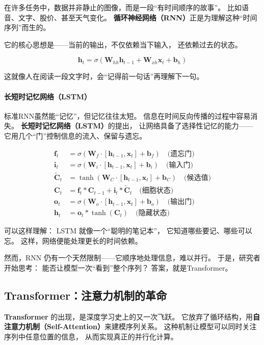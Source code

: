 在许多任务中，数据并非静止的图像，而是一段“有时间顺序的故事”。  
比如语音、文字、股价、甚至天气变化。  
\textbf{循环神经网络（RNN）}正是为理解这种“时间序列”而生的。  

它的核心思想是——当前的输出，不仅依赖当下输入，  
还依赖过去的状态。  

$$\mathbf{h}_t = \sigma(\mathbf{W}_{hh} \mathbf{h}_{t-1} + \mathbf{W}_{xh} \mathbf{x}_t + \mathbf{b}_h)$$

这就像人在阅读一段文字时，会“记得前一句话”再理解下一句。

\paragraph{长短时记忆网络（LSTM）}  
标准RNN虽然能“记忆”，但记忆往往太短。  
信息在时间反向传播的过程中容易消失。  
\textbf{长短时记忆网络（LSTM）}的提出，  
让网络具备了选择性记忆的能力——  
它用几个“门”控制信息的流入、保留与遗忘。

\begin{align}
\mathbf{f}_t &= \sigma(\mathbf{W}_f \cdot [\mathbf{h}_{t-1}, \mathbf{x}_t] + \mathbf{b}_f) \quad \text{(遗忘门)} \\
\mathbf{i}_t &= \sigma(\mathbf{W}_i \cdot [\mathbf{h}_{t-1}, \mathbf{x}_t] + \mathbf{b}_i) \quad \text{(输入门)} \\
\tilde{\mathbf{C}}_t &= \tanh(\mathbf{W}_C \cdot [\mathbf{h}_{t-1}, \mathbf{x}_t] + \mathbf{b}_C) \quad \text{(候选值)} \\
\mathbf{C}_t &= \mathbf{f}_t * \mathbf{C}_{t-1} + \mathbf{i}_t * \tilde{\mathbf{C}}_t \quad \text{(细胞状态)} \\
\mathbf{o}_t &= \sigma(\mathbf{W}_o \cdot [\mathbf{h}_{t-1}, \mathbf{x}_t] + \mathbf{b}_o) \quad \text{(输出门)} \\
\mathbf{h}_t &= \mathbf{o}_t * \tanh(\mathbf{C}_t) \quad \text{(隐藏状态)}
\end{align}

可以这样理解：  
LSTM 就像一个“聪明的笔记本”，  
它知道哪些要记、哪些可以忘。  
这样，网络便能处理更长的时间依赖。

然而，RNN 仍有一个天然限制——它顺序地处理信息，难以并行。  
于是，研究者开始思考：  
能否让模型一次“看到”整个序列？  
答案，就是Transformer。

\subsection{Transformer：注意力机制的革命}

\textbf{Transformer} 的出现，是深度学习史上的又一次飞跃。  
它放弃了循环结构，用\textbf{自注意力机制（Self-Attention）}来建模序列关系。  
这种机制让模型可以同时关注序列中任意位置的信息，  
从而实现真正的并行化计算。

